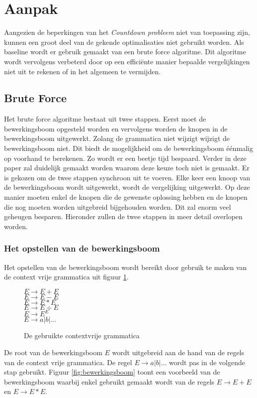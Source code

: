\documentclass[Main.tex]{subfiles}
\begin{document}
\section{Aanpak}
Aangezien de beperkingen van het \textit{Countdown probleem} niet van toepassing zijn, kunnen een groot deel van de gekende optimalisaties niet gebruikt worden. Als baseline wordt er gebruik gemaakt van een brute force algoritme. Dit algoritme wordt vervolgens verbeterd door op een effici\"ente manier bepaalde vergelijkingen niet uit te rekenen of in het algemeen te vermijden.
\subsection{Brute Force}
Het brute force algoritme bestaat uit twee stappen. Eerst moet de bewerkingsboom opgesteld worden en vervolgens worden de knopen in de bewerkingsboom uitgewerkt. Zolang de grammatica niet wijzigt wijzigt de bewerkingsboom niet. Dit biedt de mogelijkheid om de bewerkingsboom \'e\'enmalig op voorhand te berekenen. Zo wordt er een beetje tijd bespaard. %
Verder in deze paper zal duidelijk gemaakt worden waarom deze keuze toch niet is gemaakt. Er is gekozen om de twee stappen synchroon uit te voeren. Elke keer een knoop van de bewerkingsboom wordt uitgewerkt, wordt de vergelijking uitgewerkt. Op deze manier moeten enkel de knopen die de gewenste oplossing hebben en de knopen die nog moeten worden uitgebreid bijgehouden worden. Dit zal enorm veel geheugen besparen. Hieronder zullen de twee stappen in meer detail overlopen worden. 

\subsubsection*{Het opstellen van de bewerkingsboom}
Het opstellen van de bewerkingsboom wordt bereikt door gebruik te maken van de context vrije grammatica uit figuur \ref{fig:cfgVol}. 
\begin{figure}[!htb]
\centering
\begin{framed}
$E \rightarrow E + E$ \\
$E \rightarrow E - E$ \\
$E \rightarrow E \ast E$ \\
$E \rightarrow E \div E$ \\
$E \rightarrow E^{E}$ \\
$E \rightarrow a | b | \dotsc$
\end{framed}
\caption{De gebruikte contextvrije grammatica}
\label{fig:cfgVol}
\end{figure}
De root van de bewerkingsboom $E$ wordt uitgebreid aan de hand van de regels van de context vrije grammatica. De regel $E \rightarrow a | b | \dotsc$ wordt pas in de volgende stap gebruikt. Figuur \ref{fig:bewerkingsboom} toont een voorbeeld van de bewerkingsboom waarbij enkel gebruikt gemaakt wordt van de regels $E \rightarrow E+E$ en $E \rightarrow E \ast E$.
\end{document}
